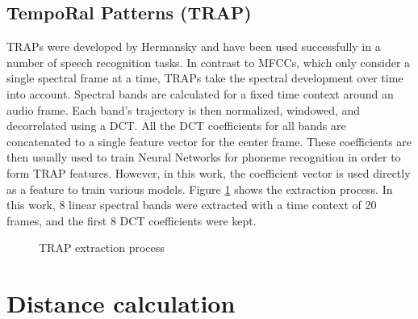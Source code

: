 \subsection{TempoRal Patterns (TRAP)} 
TRAPs were developed by Hermansky \cite{traps1} \cite{traps2} and have been used successfully in a number of speech recognition tasks. In contrast to MFCCs, which only consider a single spectral frame at a time, TRAPs take the spectral development over time into account. Spectral bands are calculated for a fixed time context around an audio frame. Each band's trajectory is then normalized, windowed, and decorrelated using a DCT. All the DCT coefficients for all bands are concatenated to a single feature vector for the center frame. These coefficients are then usually used to train Neural Networks for phoneme recognition \cite{yan_barnard}\cite{matejka} in order to form TRAP features.  However, in this work, the coefficient vector is used directly as a feature to train various models. Figure \ref{fig:traps} shows the extraction process. In this work, 8 linear spectral bands were extracted with a time context of 20 frames, and the first 8 DCT coefficients were kept.
\begin{figure}
 \centerline{}
 \caption{TRAP extraction process \cite{jens}}
 \label{fig:traps}
\end{figure}


\section{Distance calculation}
